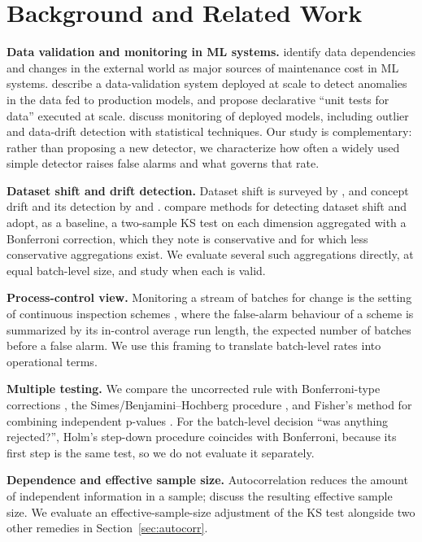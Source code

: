 \documentclass[11pt]{article}
\begin{document}
\section{Background and Related Work}
\label{sec:related}

\textbf{Data validation and monitoring in ML systems.} \citet{sculley2015hidden} identify data dependencies and changes in the external world as major sources of maintenance cost in ML systems. \citet{polyzotis2019validation} describe a data-validation system deployed at scale to detect anomalies in the data fed to production models, and \citet{schelter2018deequ} propose declarative ``unit tests for data'' executed at scale. \citet{klaise2020monitoring} discuss monitoring of deployed models, including outlier and data-drift detection with statistical techniques. Our study is complementary: rather than proposing a new detector, we characterize how often a widely used simple detector raises false alarms and what governs that rate.

\textbf{Dataset shift and drift detection.} Dataset shift is surveyed by \citet{quinonero2009dataset}, and concept drift and its detection by \citet{gama2014survey} and \citet{lu2019learning}. \citet{rabanser2019failing} compare methods for detecting dataset shift and adopt, as a baseline, a two-sample KS test on each dimension aggregated with a Bonferroni correction, which they note is conservative and for which less conservative aggregations exist. We evaluate several such aggregations directly, at equal batch-level size, and study when each is valid.

\textbf{Process-control view.} Monitoring a stream of batches for change is the setting of continuous inspection schemes \citep{page1954continuous}, where the false-alarm behaviour of a scheme is summarized by its in-control average run length, the expected number of batches before a false alarm. We use this framing to translate batch-level rates into operational terms.

\textbf{Multiple testing.} We compare the uncorrected rule with Bonferroni-type corrections \citep{dunn1961multiple}, the Simes/Benjamini--Hochberg procedure \citep{simes1986improved, benjamini1995fdr}, and Fisher's method for combining independent p-values \citep{fisher1932methods}. For the batch-level decision ``was anything rejected?'', Holm's step-down procedure \citep{holm1979simple} coincides with Bonferroni, because its first step is the same test, so we do not evaluate it separately.

\textbf{Dependence and effective sample size.} Autocorrelation reduces the amount of independent information in a sample; \citet{thiebaux1984effective} discuss the resulting effective sample size. We evaluate an effective-sample-size adjustment of the KS test alongside two other remedies in Section~\ref{sec:autocorr}.
\end{document}
